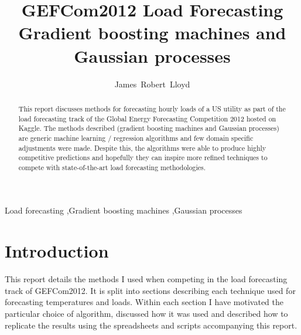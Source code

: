 \documentclass[preprint,authoryear,12pt]{elsarticle}
\begin{document}
\begin{frontmatter}


\title{GEFCom2012 Load Forecasting \\ Gradient boosting machines and Gaussian processes}
\author{James~Robert~Lloyd}
\address{Department of Engineering, University of Cambridge}


\author{}

\address{}

\begin{abstract}
This report discusses methods for forecasting hourly loads of a US utility as part of the load forecasting track of the Global Energy Forecasting Competition 2012 hosted on Kaggle.
The methods described (gradient boosting machines and Gaussian processes) are generic machine learning / regression algorithms and few domain specific adjustments were made.
Despite this, the algorithms were able to produce highly competitive predictions and hopefully they can inspire more refined techniques to compete with state-of-the-art load forecasting methodologies.
\end{abstract}

\begin{keyword}
Load forecasting \sep Gradient boosting machines \sep Gaussian processes
\end{keyword}

\end{frontmatter}

\section{Introduction}

This report details the methods I used when competing in the load forecasting track of GEFCom2012\footnotemark.
It is split into sections describing each technique used for forecasting temperatures and loads.
Within each section I have motivated the particular choice of algorithm, discussed how it was used and described how to replicate the results using the spreadsheets and scripts accompanying this report\footnotemark.
\end{document}
